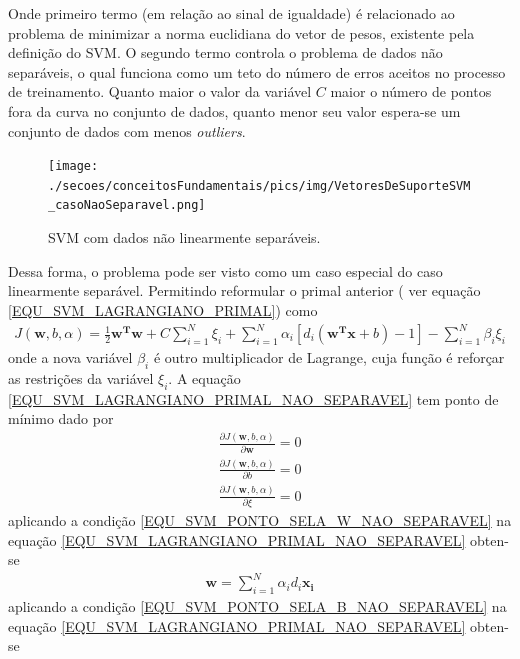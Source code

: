 Onde primeiro termo (em relação ao sinal de igualdade) é relacionado ao problema de minimizar a norma euclidiana do vetor de pesos, existente pela definição do SVM. O segundo termo controla o problema de dados não separáveis, o qual funciona como um teto do número de erros aceitos no processo de treinamento. Quanto maior o valor da variável \(C\) maior o número de pontos fora da curva no conjunto de dados, quanto menor seu valor espera-se um conjunto de dados com menos \emph{outliers}.
\begin{figure}[H]
  \centering
  \caption{SVM com dados não linearmente separáveis.}
  \texttt{[image: ./secoes/conceitosFundamentais/pics/img/VetoresDeSuporteSVM\_casoNaoSeparavel.png]}
  \label{FIGURA_SVM_Caso_Nao_Separavel}
\end{figure}
Dessa forma, o problema pode ser visto como um caso especial do caso linearmente separável. Permitindo reformular o primal anterior ( ver equação \eqref{EQU_SVM_LAGRANGIANO_PRIMAL}) como
\begin{align}
J(\mathbf{w}, b, \alpha) = \frac{1}{2}\mathbf{w^{T}}\mathbf{w} + C\sum\limits_{i=1}^{N}\xi_{i} + \sum\limits_{i=1}^{N} \alpha_{i}[d_{i}(\mathbf{w^{T}}\mathbf{x} + b) - 1] - \sum\limits_{i=1}^{N}\beta_{i} \xi_{i}  \label{EQU_SVM_LAGRANGIANO_PRIMAL_NAO_SEPARAVEL}
\end{align}
onde a nova variável \(\beta_{i}\) é outro multiplicador de Lagrange, cuja função é reforçar as restrições da variável \(\xi_{i}\). 
A equação \eqref{EQU_SVM_LAGRANGIANO_PRIMAL_NAO_SEPARAVEL} tem ponto de mínimo dado por
\begin{align}
 \frac{\partial J(\mathbf{w}, b, \alpha)}{\partial \mathbf{w}} = 0	\label{EQU_SVM_PONTO_SELA_W_NAO_SEPARAVEL}\\
 \frac{\partial J(\mathbf{w}, b, \alpha)}{\partial b} = 0  			\label{EQU_SVM_PONTO_SELA_B_NAO_SEPARAVEL}\\
 \frac{\partial J(\mathbf{w}, b, \alpha)}{\partial \xi} = 0  		\label{EQU_SVM_PONTO_SELA_xi_NAO_SEPARAVEL}
\end{align}
aplicando a condição \eqref{EQU_SVM_PONTO_SELA_W_NAO_SEPARAVEL} na equação \eqref{EQU_SVM_LAGRANGIANO_PRIMAL_NAO_SEPARAVEL} obten-se 
\begin{align}
\mathbf{w} = \sum\limits_{i=1}^{N} \alpha_{i}d_{i}\mathbf{x_{i}}  \label{EQU_SVM_PONTO_SELA_W_RESTRICAO_OBTIDA_NAO_SEPARAVEL}
\end{align}
aplicando a condição \eqref{EQU_SVM_PONTO_SELA_B_NAO_SEPARAVEL} na equação \eqref{EQU_SVM_LAGRANGIANO_PRIMAL_NAO_SEPARAVEL} obten-se 
